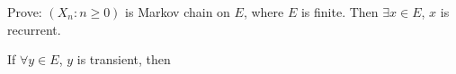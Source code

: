 \documentclass{ctexart}
\begin{document}
\begin{problem}\label{pro:3}
  Prove: \((X_n: n \geq 0)\) is Markov chain on \(E\), where \(E\) is finite. Then \(\exists x \in E\), \(x\) is recurrent.
\end{problem}
\begin{solution}
  If \(\forall y \in E\), \(y\) is transient, then \(\)
\end{solution}
\end{document}
